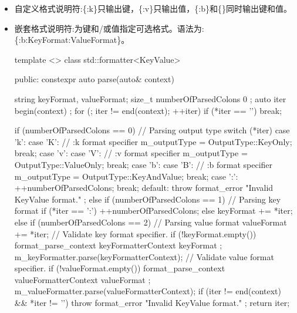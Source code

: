 \begin{itemize}
\item
自定义格式说明符:\{:k\}只输出键，\{:v\}只输出值，\{:b\}和\{\}同时输出键和值。

\item
嵌套格式说明符:为键和/或值指定可选格式。语法为:\{:b:KeyFormat:ValueFormat\}。

\begin{cpp}
template <>
class std::formatter<KeyValue>
{
    public:
        constexpr auto parse(auto& context)
        {
            string keyFormat, valueFormat;
            size_t numberOfParsedColons { 0 };
            auto iter { begin(context) };
            for (; iter != end(context); ++iter) {
                if (*iter == '}') { break; }

                if (numberOfParsedColons == 0) { // Parsing output type
                    switch (*iter) {
                        case 'k': case 'K': // {:k format specifier
                            m_outputType = OutputType::KeyOnly; break;
                        case 'v': case 'V': // {:v format specifier
                            m_outputType = OutputType::ValueOnly; break;
                        case 'b': case 'B': // {:b format specifier
                            m_outputType = OutputType::KeyAndValue; break;
                        case ':':
                            ++numberOfParsedColons; break;
                        default:
                            throw format_error { "Invalid KeyValue format." };
                    }
                } else if (numberOfParsedColons == 1) { // Parsing key format
                    if (*iter == ':') { ++numberOfParsedColons; }
                    else { keyFormat += *iter; }
                } else if (numberOfParsedColons == 2) { // Parsing value format
                    valueFormat += *iter;
                }
            }
            // Validate key format specifier.
            if (!keyFormat.empty()) {
                format_parse_context keyFormatterContext { keyFormat };
                m_keyFormatter.parse(keyFormatterContext);
            }
            // Validate value format specifier.
            if (!valueFormat.empty()) {
                format_parse_context valueFormatterContext { valueFormat };
                m_valueFormatter.parse(valueFormatterContext);
            }
            if (iter != end(context) && *iter != '}') {
                throw format_error { "Invalid KeyValue format." };
            }
            return iter;
        }

}}
\end{cpp}
\end{itemize}
